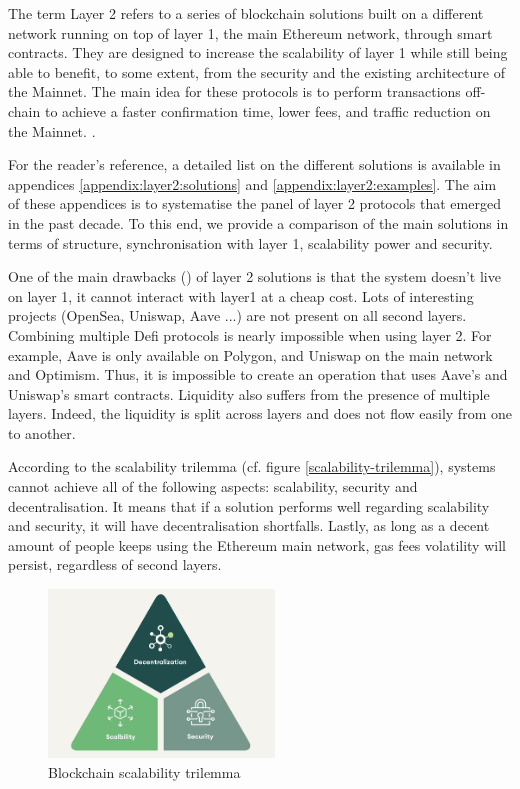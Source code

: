 The term Layer 2 refers to a series of blockchain solutions built on a different network running on top of layer 1, the main Ethereum network, through smart contracts. They are designed to increase the scalability of layer 1 while still being able to benefit, to some extent, from the security and the existing architecture of the Mainnet. The main idea for these protocols is to perform transactions off-chain to achieve a faster confirmation time, lower fees, and traffic reduction on the Mainnet. \cite{gudgeon_sok_2020, noauthor_layer_nodate}. 

For the reader's reference, a detailed list on the different solutions is available in appendices \ref{appendix:layer2:solutions} and \ref{appendix:layer2:examples}. The aim of these appendices is to systematise the panel of layer 2 protocols that emerged in the past decade. To this end, we provide a comparison of the main solutions in terms of structure, synchronisation with layer 1, scalability power and security.

One of the main drawbacks (\cite{0xjim_layer_2021}) of layer 2 solutions is that the system doesn't live on layer 1, it cannot interact with layer1 at a cheap cost. Lots of interesting projects (OpenSea, Uniswap, Aave ...) are not present on all second layers. Combining multiple Defi protocols is nearly impossible when using layer 2. For example, Aave is only available on Polygon, and Uniswap on the main network and Optimism. Thus, it is impossible to create an operation that uses Aave’s and Uniswap’s smart contracts. Liquidity also suffers from the presence of multiple layers. Indeed, the liquidity is split across layers and does not flow easily from one to another.

According to the scalability trilemma (cf. figure \ref{scalability-trilemma}), systems cannot achieve all of the following aspects: scalability, security and decentralisation. It means that if a solution performs well regarding scalability and security, it will have decentralisation shortfalls.
Lastly, as long as a decent amount of people keeps using the Ethereum main network, gas fees volatility will persist, regardless of second layers.


\begin{figure}[htbp]
    \centerline{\includegraphics[width=60mm]{figures/scalability-trilemma.png}}
    \caption{Blockchain scalability trilemma \cite{BlockchainTrilemma}}
    \label{fig:scalability-trilemma}
\end{figure}



